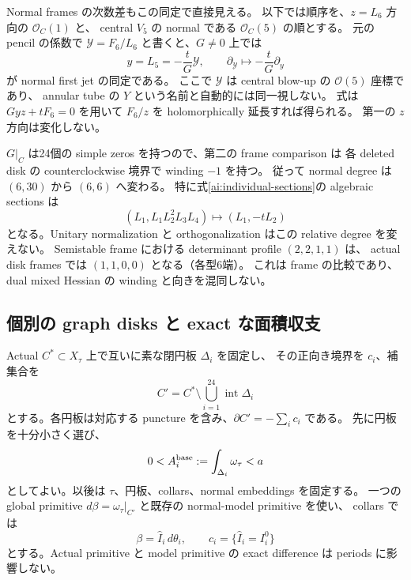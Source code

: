 Normal frames の次数差もこの同定で直接見える。
以下では順序を、$z=L_6$ 方向の $\mathcal O_C(1)$ と、
central $V_5$ の normal である $\mathcal O_C(5)$ の順とする。
元の pencil の係数で $\mathcal Y=F_6/L_6$ と書くと、$G\ne0$ 上では
\begin{equation}\label{ad:frame-comparison}
 y=L_5=-\frac{t}{G}\mathcal Y,
 \qquad
 \partial_{\mathcal Y}\longmapsto-\frac{t}{G}\partial_y
\end{equation}
が normal first jet の同定である。
ここで $\mathcal Y$ は central blow-up の $\mathcal O(5)$ 座標であり、
annular tube の $Y$ という名前と自動的には同一視しない。
式は $Gyz+tF_6=0$ を用いて $F_6/z$ を holomorphically 延長すれば得られる。
第一の $z$ 方向は変化しない。

$G|_C$ は24個の simple zeros を持つので、第二の frame comparison は
各 deleted disk の counterclockwise 境界で winding $-1$ を持つ。
従って normal degree は $(6,30)$ から $(6,6)$ へ変わる。
特に式\eqref{ai:individual-sections}の algebraic sections は
\begin{equation}\label{ad:actual-sections}
 (L_1,L_1L_2^2L_3L_4)\longmapsto(L_1,-tL_2)
\end{equation}
となる。Unitary normalization と orthogonalization はこの relative degree を変えない。
Semistable frame における determinant profile $(2,2,1,1)$ は、
actual disk frames では $(1,1,0,0)$ となる（各型6端）。
これは frame の比較であり、dual mixed Hessian の winding と向きを混同しない。

\subsection{個別の graph disks と exact な面積収支}

Actual $C^*\subset X_\tau$ 上で互いに素な閉円板 $\Delta_i$ を固定し、
その正向き境界を $c_i$、補集合を
\[
 C'=C^*\setminus\bigcup_{i=1}^{24}\operatorname{int}\Delta_i
\]
とする。各円板は対応する puncture を含み、$\partial C'=-\sum_i c_i$ である。
先に円板を十分小さく選び、
\[
 0<A_i^{\rm base}:=\int_{\Delta_i}\omega_\tau<a
\]
としてよい。以後は $\tau$、円板、collars、normal embeddings を固定する。
一つの global primitive $d\beta=\omega_\tau|_{C'}$ と既存の normal-model primitive を使い、
collars では
\[
 \beta=\widehat I_i\,d\theta_i,\qquad c_i=\{\widehat I_i=I_i^0\}
\]
とする。Actual primitive と model primitive の exact difference は periods に影響しない。

